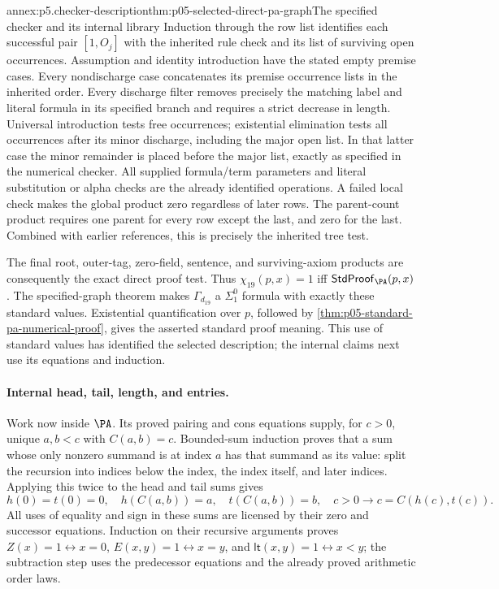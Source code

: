 \begin{annexitem}{annex:p5.checker-description}{thm:p05-selected-direct-pa-graph}{The specified checker and its internal library}
Induction through the row list identifies each successful pair
\([1,O_j]\) with the inherited rule check and its list of surviving open
occurrences.  Assumption and identity introduction have the stated empty
premise cases.  Every nondischarge case concatenates its premise occurrence
lists in the inherited order.  Every discharge filter removes precisely the
matching label and literal formula in its specified branch and requires a
strict decrease in length.  Universal introduction tests free occurrences;
existential elimination tests all occurrences after its minor discharge,
including the major open list.  In that latter case the minor remainder is
placed before the major list, exactly as specified in the numerical checker.
All supplied formula/term parameters and literal substitution or alpha checks
are the already identified operations.  A failed local check makes the global
product zero regardless of later rows.  The parent-count product requires one
parent for every row except the last, and zero for the last.  Combined with
earlier references, this is precisely the inherited tree test.

The final root, outer-tag, zero-field, sentence, and surviving-axiom products
are consequently the exact direct proof test.  Thus
\(\chi_{19}(p,x)=1\) iff \(\mathsf{StdProof}_{\PA}(p,x)\).
The specified-graph theorem makes \(\Gamma_{d_{19}}\) a
\(\Sigma^0_1\) formula with exactly these standard values.  Existential
quantification over \(p\), followed by
\cref{thm:p05-standard-pa-numerical-proof}, gives the asserted standard
proof meaning.  This use of standard values has identified the selected
description; the internal claims next use its equations and induction.

\paragraph{Internal head, tail, length, and entries.}
Work now inside \(\PA\).  Its proved pairing and cons equations supply,
for \(c>0\), unique \(a,b<c\) with \(C(a,b)=c\).  Bounded-sum
induction proves that a sum whose only nonzero summand is at index \(a\)
has that summand as its value: split the recursion into indices below the
index, the index itself, and later indices.  Applying this twice to the head
and tail sums gives
\[
 h(0)=t(0)=0,\quad h(C(a,b))=a,\quad t(C(a,b))=b,
 \quad c>0\to c=C(h(c),t(c)).
\]
All uses of equality and sign in these sums are licensed by their zero and
successor equations.  Induction on their recursive arguments proves
\(Z(x)=1\leftrightarrow x=0\),
\(E(x,y)=1\leftrightarrow x=y\), and
\(\mathsf{lt}(x,y)=1\leftrightarrow x<y\); the subtraction step uses
the predecessor equations and the already proved arithmetic order laws.


\end{annexitem}
